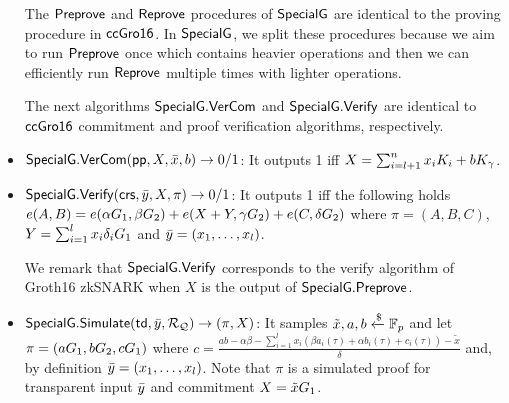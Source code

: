 \begin{itemize}
The $ {\mathsf{Preprove}} $ and $ {\mathsf{Reprove}} $ procedures of $ {\mathsf{SpecialG}} $ are identical to the proving procedure in $ {\mathsf{ccGro16}} $. In $ {\mathsf{SpecialG}} $, we split these procedures because we aim to run $ {\mathsf{Preprove}} $ once which contains heavier operations and then we can efficiently run $ {\mathsf{Reprove}} $ multiple times  with lighter operations.   


The next algorithms $ {\mathsf{SpecialG}}.{\mathsf{VerCom}} $ and $ {\mathsf{SpecialG}}.{\mathsf{Verify}} $ are identical to $ {\mathsf{ccGro16}} $ commitment and proof verification algorithms, respectively.
\item ${\mathsf{SpecialG}}.{\mathsf{VerCom}}(\mathsf{pp}, X, \bar{x}, b) \rightarrow 0/1$: It outputs 1 iff
$X = \sum_{i=l+1}^{n} x_i K_i   + b K_{\gamma}$. 
\item ${\mathsf{SpecialG}}.{\mathsf{Verify}}(\mathsf{crs}, \bar{y}, X, \pi) \rightarrow 0/1$: It outputs  1 iff the following holds 
$e(A,B) = e(\alpha{G}_1, \beta{G}_2) + e(X + Y, \gamma {G}_2) + e(C, \delta {G}_2)$
where $\pi = (A, B, C)$, $Y = \sum_{i=1}^{l} x_i \delta_i{G}_1$ 
and $\bar{y} = (x_1, \ldots, x_l)$. 

We remark that $ {\mathsf{SpecialG}}.{\mathsf{Verify}} $ corresponds to the verify algorithm of Groth16 zkSNARK when $ X $ is the output of $ {\mathsf{SpecialG}}.{\mathsf{Preprove}}$. 

\item${\mathsf{SpecialG}}.{\mathsf{Simulate}}(\mathsf{td}, \bar{y}, \mathcal{R}_{\mathcal{Q}}) \rightarrow (\pi, X)$: It samples $\tilde{x}, a, b \xleftarrow {\$} \mathbb{F}_p$ and let $\pi = (a{G}_1, b {G}_2 , c{G}_1)$ where $c = \frac{ab - \alpha \beta - \sum_{i=1}^{l} x_i (\beta a_i(\tau)+ \alpha b_i(\tau)+ c_i(\tau))- \tilde{x}}{\delta}  $ and, 
by definition $\bar{y} = (x_1, \ldots, x_l)$. Note that $\pi$ is a simulated proof for transparent input $\bar{y}$ 
and commitment $X = \tilde{x} {G}_1$.
\end{itemize} 



